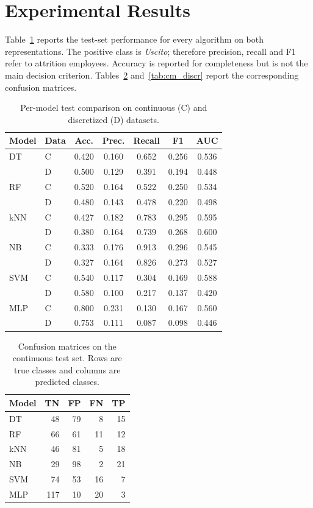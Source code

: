 \documentclass[lettersize,journal]{IEEEtran}
\begin{document}
\section{Experimental Results}
Table~\ref{tab:model_results} reports the test-set performance for every algorithm on both representations. The positive class is \emph{Uscito}; therefore precision, recall and F1 refer to attrition employees. Accuracy is reported for completeness but is not the main decision criterion. Tables~\ref{tab:cm} and~\ref{tab:cm_discr} report the corresponding confusion matrices.

\begin{table}[t]
\caption{Per-model test comparison on continuous (C) and discretized (D) datasets.}
\label{tab:model_results}
\centering
\scriptsize
\setlength{\tabcolsep}{2.5pt}
\begin{tabular}{llccccc}
\toprule
Model & Data & Acc. & Prec. & Recall & F1 & AUC \\
\midrule
DT  & C & 0.420 & 0.160 & 0.652 & 0.256 & 0.536 \\
    & D & 0.500 & 0.129 & 0.391 & 0.194 & 0.448 \\
RF  & C & 0.520 & 0.164 & 0.522 & 0.250 & 0.534 \\
    & D & 0.480 & 0.143 & 0.478 & 0.220 & 0.498 \\
kNN & C & 0.427 & 0.182 & 0.783 & 0.295 & 0.595 \\
    & D & 0.380 & 0.164 & 0.739 & 0.268 & 0.600 \\
NB  & C & 0.333 & 0.176 & 0.913 & 0.296 & 0.545 \\
    & D & 0.327 & 0.164 & 0.826 & 0.273 & 0.527 \\
SVM & C & 0.540 & 0.117 & 0.304 & 0.169 & 0.588 \\
    & D & 0.580 & 0.100 & 0.217 & 0.137 & 0.420 \\
MLP & C & 0.800 & 0.231 & 0.130 & 0.167 & 0.560 \\
    & D & 0.753 & 0.111 & 0.087 & 0.098 & 0.446 \\
\bottomrule
\end{tabular}
\end{table}

\begin{table}[t]
\caption{Confusion matrices on the continuous test set. Rows are true classes and columns are predicted classes.}
\label{tab:cm}
\centering
\scriptsize
\setlength{\tabcolsep}{3pt}
\begin{tabular}{lrrrr}
\toprule
Model & TN & FP & FN & TP \\
\midrule
DT  & 48  & 79 &  8 & 15 \\
RF  & 66  & 61 & 11 & 12 \\
kNN & 46  & 81 &  5 & 18 \\
NB  & 29  & 98 &  2 & 21 \\
SVM & 74  & 53 & 16 &  7 \\
MLP & 117 & 10 & 20 &  3 \\
\bottomrule
\end{tabular}
\end{table}
\end{document}
